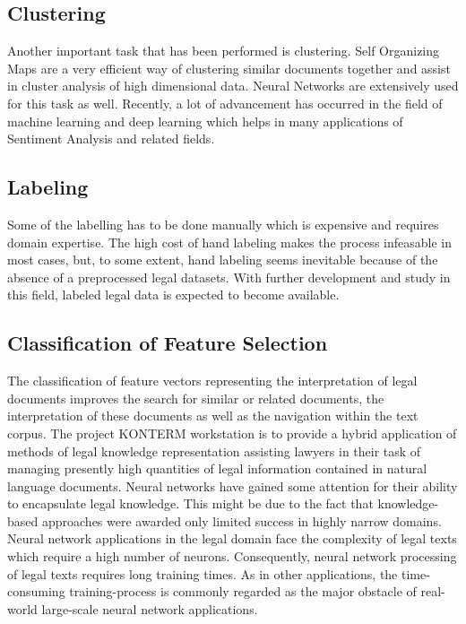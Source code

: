 \documentclass[11pt]{article}
\begin{document}
\subsection{Clustering}
Another important task that has been performed is clustering. Self Organizing Maps \cite{schweighofer2001automatic} are a very efficient way of clustering similar documents together and assist in cluster analysis of high dimensional data. Neural Networks are extensively used for this task as well. Recently, a lot of advancement has occurred in the field of machine learning and deep learning which helps in many applications of Sentiment Analysis and related fields. 

\subsection{Labeling}
Some of the labelling has to be done manually which is expensive and requires domain expertise. The high cost of hand labeling makes the process infeasable in most cases, but, to some extent, hand labeling seems inevitable because of the absence of a preprocessed legal datasets.  With further development and study in this field, labeled legal data is expected to become available. 

\subsection{Classification of Feature Selection}
The classification of feature vectors representing the interpretation of legal documents improves the search for similar or related documents, the interpretation of these documents as well as the navigation within the text corpus. The project KONTERM \cite{bochereau1991extracting} workstation is to provide a hybrid application of methods of legal knowledge representation assisting lawyers in their task of managing presently high quantities of legal information contained in natural language documents. Neural networks have gained some attention for their ability to encapsulate legal knowledge. This might be due to the fact that knowledge-based approaches were awarded only limited success in highly narrow domains. Neural network applications in the legal domain face the complexity of legal texts which require a high number of neurons.  Consequently, neural network processing of legal texts requires long training times. As in other applications, the time-consuming training-process is commonly regarded as the major obstacle of real-world large-scale neural network applications.
\end{document}
